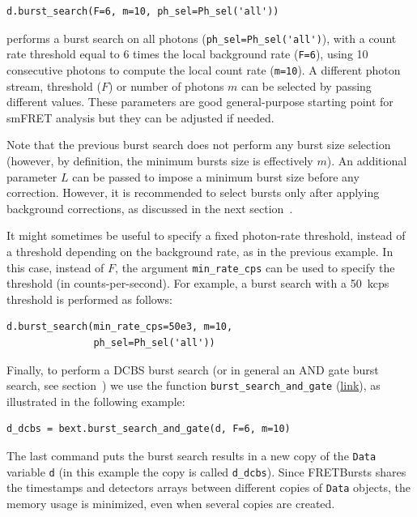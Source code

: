 \documentclass[10pt,letterpaper]{article}
\begin{document}
\begin{lstlisting}
d.burst_search(F=6, m=10, ph_sel=Ph_sel('all'))
\end{lstlisting}

\noindent performs a burst search on all photons
(\verb|ph_sel=Ph_sel('all')|), with a count rate threshold equal to 6 times the
local background rate (\verb|F=6|), using 10 consecutive photons to compute the
local count rate (\verb|m=10|).
A different photon stream, threshold ($F$) or number of photons $m$ can be selected
by passing different values.
These parameters are good general-purpose starting point for smFRET analysis
but they can be adjusted if needed.

Note that the previous burst search does not perform any burst size selection
(however, by definition, the minimum bursts size is effectively $m$).
An additional parameter $L$ can be passed to impose a minimum burst
size before any correction.
However, it is recommended to select bursts only after applying background 
corrections, as discussed in the next section~.

It might sometimes be useful to specify a fixed photon-rate threshold, instead
of a threshold depending on the background rate, as in the previous example. In
this case, instead of $F$, the argument \verb|min_rate_cps| can be used to
specify the threshold (in counts-per-second). For example, a burst search with
a 50~kcps threshold is performed as follows:

\begin{lstlisting}
d.burst_search(min_rate_cps=50e3, m=10,
               ph_sel=Ph_sel('all'))
\end{lstlisting}

Finally, to perform a DCBS burst search (or in general an AND gate burst search,
see section~) we use the function
\verb|burst_search_and_gate|
(\href{http://fretbursts.readthedocs.org/en/latest/plugins.html#fretbursts.burstlib_ext.burst_search_and_gate}{link}),
as illustrated in the following example:

\begin{lstlisting}
d_dcbs = bext.burst_search_and_gate(d, F=6, m=10)
\end{lstlisting}

The last command puts the burst search results in a new copy of the 
\verb|Data| variable \verb|d|
(in this example the copy is called \verb|d_dcbs|).
Since FRETBursts shares the timestamps and detectors arrays between
different copies of \verb|Data| objects, the memory usage is minimized, even when
several copies are created.
\end{document}

